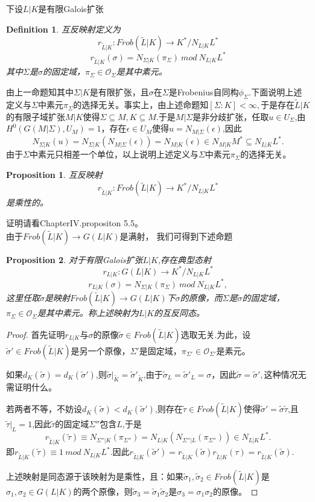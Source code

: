 \documentclass[UTF8]{article}
\newtheorem{defn}{Definition}[section]
\newtheorem{prop}{Proposition}[section]
\begin{document}
下设$L|K$是有限Galois扩张
\begin{defn}
	互反映射定义为
	$$
	r_{\widetilde{L}|K}:Frob(\widetilde{L}|K)\rightarrow K^{*}/N_{L|K}{L}^{*}$$
	$$
		r_{\widetilde{L}|K}(\sigma)=N_{\Sigma|K}(\pi_{\Sigma})\ mod \ N_{L|K}{L}^{*}
	$$
	其中$\Sigma$是$\sigma$的固定域，$\pi_{\Sigma}\in \mathcal{O}_{\Sigma}$是其中素元。
\end{defn}
由上一命题知其中$\Sigma|K$是有限扩张，且$\sigma$在$\Sigma$是Frobenius自同构$\phi_{\Sigma}$.下面说明上述定义与$\Sigma$中素元$\pi_{\Sigma}$的选择无关。事实上，由上述命题知$[\Sigma:K]< \infty,$于是存在$\widetilde{L}|K$的有限子域扩张$M|K$使得$\Sigma\subseteq M,K\subseteq M.$于是$M|\Sigma$是非分歧扩张，任取$u\in U_{\Sigma}$,由$H^{0}(G(M|\Sigma),U_{M})=1$，存在$\epsilon\in U_{M}$使得$u=N_{M|\Sigma}(\epsilon)$,因此
$$
N_{\Sigma|K}(u)=N_{\Sigma|K}(N_{M|\Sigma}(\epsilon))=N_{M|K}(\epsilon)\in N_{M|K}M^{*}\subseteq N_{L|K}{L}^{*}.
$$
由于$\Sigma$中素元只相差一个单位，以上说明上述定义与$\Sigma$中素元$\pi_{\Sigma}$的选择无关。
\begin{prop}
	互反映射
	$$
	r_{\widetilde{L}|K}:Frob(\widetilde{L}|K)\rightarrow K^{*}/N_{L|K}{L}^{*}$$
是乘性的。
\end{prop}
证明请看\cite{Ne}ChapterIV.propositon 5.5。\\
由于$Frob(\widetilde{L}|K)\rightarrow G(L|K)$是满射，
我们可得到下述命题
\begin{prop}
	对于有限Galois扩张$L|K$,存在典型态射
	$$r_{L|K}:G(L|K)\rightarrow K^{*}/N_{L|K}L^{*}$$
	$$r_{L|K}(\sigma)=N_{\Sigma|K}(\pi_{\Sigma})\ mod \ N_{L|K}L^{*},$$
	这里任取$\tilde{\sigma}$是映射$Frob(\widetilde{L}|K)\rightarrow G(L|K)$下$\sigma$的原像，而$\Sigma$是$\tilde{\sigma}$的固定域，$\pi_{\Sigma}\in \mathcal{O}_{\Sigma}$是其中素元。称上述映射为$L|K$的互反同态。
\end{prop}
\begin{proof}
	首先证明$r_{L|K}$与$\sigma$的原像$\tilde{\sigma}\in Frob(\widetilde{L}|K)$选取无关.为此，设$\tilde{\sigma}'\in Frob(\widetilde{L}|K)$是另一个原像，$\Sigma'$是固定域，$\pi_{\Sigma'}\in \mathcal{O}_{\Sigma'}$是素元。
	
	如果$d_{K}(\tilde{\sigma})=d_{K}(\tilde{\sigma}')$,则$\tilde{\sigma}|_{\widetilde{K}}=\tilde{\sigma}'_{\widetilde{K}}$,由于$\tilde{\sigma}_{L}=\tilde{\sigma}'_{L}=\sigma$，因此$\tilde{\sigma}=\tilde{\sigma}',$这种情况无需证明什么。
	
	若两者不等，不妨设$d_{K}(\tilde{\sigma})<d_{K}(\tilde{\sigma}')$,则存在$\tilde{\tau}\in Frob(\widetilde{L}|K)$使得$\tilde{\sigma}'=\tilde{\sigma}\tilde{\tau}$,且$\tilde{\tau}|_{L}=1$,因此$\tilde{\tau}$的固定域$\Sigma''$包含$L$,于是
	$$
	r_{\widetilde{L}|K}(\tilde{\tau})\equiv N_{\Sigma''|K}(\pi_{\Sigma''})=N_{L|K}(N_{\Sigma''|L}(\pi_{\Sigma''}))\in N_{L|K}L^{*}.
	$$
	即$r_{\widetilde{L}|K}(\tilde{\tau})\equiv1\ mod \ N_{L|K}L^{*}.$因此$r_{\widetilde{L}|K}(\tilde{\sigma}')=r_{\widetilde{L}|K}(\tilde{\sigma})r_{\widetilde{L}|K}(\tau)=r_{\widetilde{L}|K}(\tilde{\sigma})$.
	
	上述映射是同态源于该映射为是乘性，且：如果$\tilde{\sigma}_{1},\tilde{\sigma}_{2}\in Frob(\widetilde{L}|K)$是$\sigma_{1},\sigma_{2}\in G(L|K)$的两个原像，则$\tilde{\sigma}_{3}=\tilde{\sigma}_{1}\tilde{\sigma}_{2}$是$\sigma_{3}=\sigma_{1}\sigma_{2}$的原像。
\end{proof}
\end{document}
